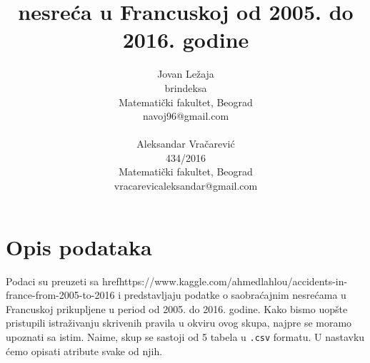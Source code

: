 \documentclass[a4paper,10pt]{article}
\title{nesreća u Francuskoj od 2005. do 2016. godine}
\author{Jovan Ležaja \\ 
	brindeksa \\
	Matematički fakultet, Beograd \\
	navoj96@gmail.com \\
	\\
	Aleksandar Vračarević \\
	434/2016 \\
	Matematički fakultet, Beograd \\
	vracarevicaleksandar@gmail.com}
\begin{document}
\maketitle

\section{Opis podataka}

Podaci su preuzeti sa href{https://www.kaggle.com/ahmedlahlou/accidents-in-france-from-2005-to-2016} i predstavljaju podatke o saobraćajnim nesrećama u Francuskoj prikupljene u period od 2005. do 2016. godine. Kako bismo uopšte pristupili istraživanju skrivenih pravila u okviru ovog skupa, najpre se moramo upoznati sa istim. Naime, skup se sastoji od 5 tabela u \texttt{.csv} formatu. U nastavku ćemo opisati atribute svake od njih. \\
\end{document}
